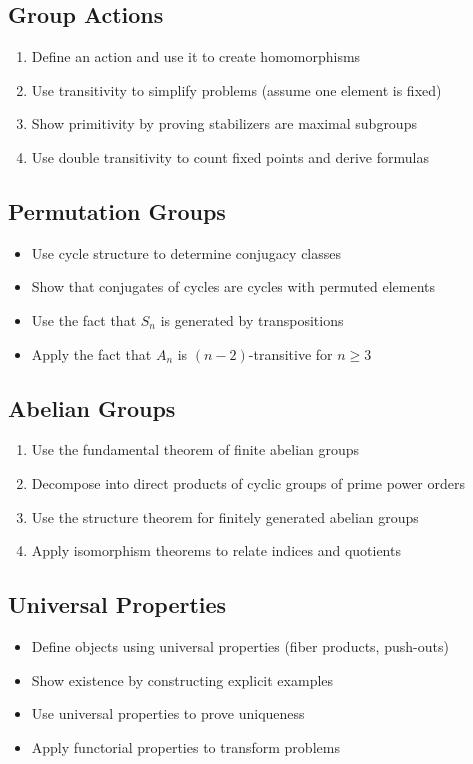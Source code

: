 \subsection*{Group Actions}
\begin{enumerate}
\item Define an action and use it to create homomorphisms
\item Use transitivity to simplify problems (assume one element is fixed)
\item Show primitivity by proving stabilizers are maximal subgroups
\item Use double transitivity to count fixed points and derive formulas
\end{enumerate}

\subsection*{Permutation Groups}
\begin{itemize}
\item Use cycle structure to determine conjugacy classes
\item Show that conjugates of cycles are cycles with permuted elements
\item Use the fact that $S_n$ is generated by transpositions
\item Apply the fact that $A_n$ is $(n-2)$-transitive for $n \geq 3$
\end{itemize}

\subsection*{Abelian Groups}
\begin{enumerate}
\item Use the fundamental theorem of finite abelian groups
\item Decompose into direct products of cyclic groups of prime power orders
\item Use the structure theorem for finitely generated abelian groups
\item Apply isomorphism theorems to relate indices and quotients
\end{enumerate}

\subsection*{Universal Properties}
\begin{itemize}
\item Define objects using universal properties (fiber products, push-outs)
\item Show existence by constructing explicit examples
\item Use universal properties to prove uniqueness
\item Apply functorial properties to transform problems
\end{itemize}


